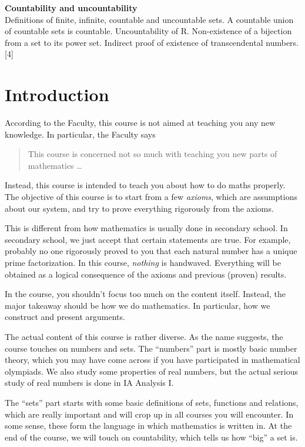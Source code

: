 \documentclass[a4paper]{article}
\begin{document}
{  \vspace{10pt}
  \noindent\textbf{Countability and uncountability}\\
  Definitions of finite, infinite, countable and uncountable sets. A countable union of countable sets is countable. Uncountability of R. Non-existence of a bijection from a set to its power set. Indirect proof of existence of transcendental numbers.\hspace*{\fill}[4]}

\tableofcontents

\setcounter{section}{-1}
\section{Introduction}
According to the Faculty, this course is not aimed at teaching you any new knowledge. In particular, the Faculty says
\begin{quote}
  This course is concerned not so much with teaching you new parts of mathematics \ldots
\end{quote}

Instead, this course is intended to teach you about how to do maths properly. The objective of this course is to start from a few \emph{axioms}, which are assumptions about our system, and try to prove everything rigorously from the axioms.

This is different from how mathematics is usually done in secondary school. In secondary school, we just accept that certain statements are true. For example, probably no one rigorously proved to you that each natural number has a unique prime factorization. In this course, \emph{nothing} is handwaved. Everything will be obtained as a logical consequence of the axioms and previous (proven) results.

In the course, you shouldn't focus too much on the content itself. Instead, the major takeaway should be how we do mathematics. In particular, how we construct and present arguments.

The actual content of this course is rather diverse. As the name suggests, the course touches on numbers and sets. The ``numbers'' part is mostly basic number theory, which you may have come across if you have participated in mathematical olympiads. We also study some properties of real numbers, but the actual serious study of real numbers is done in IA Analysis I.

The ``sets'' part starts with some basic definitions of sets, functions and relations, which are really important and will crop up in all courses you will encounter. In some sense, these form the language in which mathematics is written in. At the end of the course, we will touch on countability, which tells us how ``big'' a set is.
\end{document}
